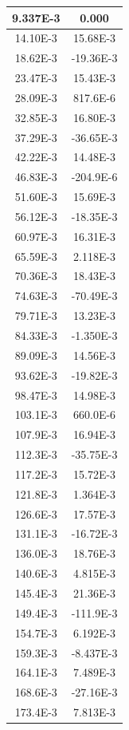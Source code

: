 \documentclass[english, 12pt, a4paper]{ifimaster}
\begin{document}
\begin{appendices}
\begin{center}
\begin{longtable}[htbp]{|c|c|}
\hline \hline
\endlastfoot
\hline
  9.337E-3 & 0.000 \\
\hline
  14.10E-3 & 15.68E-3 \\
\hline
  18.62E-3 & -19.36E-3 \\
\hline
  23.47E-3 & 15.43E-3 \\
\hline
  28.09E-3 & 817.6E-6 \\
\hline
  32.85E-3 & 16.80E-3 \\
\hline
  37.29E-3 & -36.65E-3 \\
\hline
  42.22E-3 & 14.48E-3 \\
\hline
  46.83E-3 & -204.9E-6 \\
\hline
  51.60E-3 & 15.69E-3 \\
\hline
  56.12E-3 & -18.35E-3 \\
\hline
  60.97E-3 & 16.31E-3 \\
\hline
  65.59E-3 & 2.118E-3 \\
\hline
  70.36E-3 & 18.43E-3 \\
\hline
  74.63E-3 & -70.49E-3 \\
\hline
  79.71E-3 & 13.23E-3 \\
\hline
  84.33E-3 & -1.350E-3 \\
\hline
  89.09E-3 & 14.56E-3 \\
\hline
  93.62E-3 & -19.82E-3 \\
\hline
  98.47E-3 & 14.98E-3 \\
\hline
  103.1E-3 & 660.0E-6 \\
\hline
  107.9E-3 & 16.94E-3 \\
\hline
  112.3E-3 & -35.75E-3 \\
\hline
  117.2E-3 & 15.72E-3 \\
\hline
  121.8E-3 & 1.364E-3 \\
\hline
  126.6E-3 & 17.57E-3 \\
\hline
  131.1E-3 & -16.72E-3 \\
\hline
  136.0E-3 & 18.76E-3 \\
\hline
  140.6E-3 & 4.815E-3 \\
\hline
  145.4E-3 & 21.36E-3 \\
\hline
  149.4E-3 & -111.9E-3 \\
\hline
  154.7E-3 & 6.192E-3 \\
\hline
  159.3E-3 & -8.437E-3 \\
\hline
  164.1E-3 & 7.489E-3 \\
\hline
  168.6E-3 & -27.16E-3 \\
\hline
  173.4E-3 & 7.813E-3 \\

\end{longtable}
\end{center}
\end{appendices}
\end{document}
